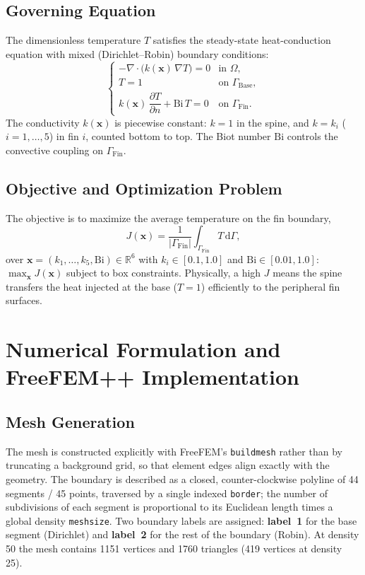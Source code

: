 \documentclass[11pt,a4paper]{article}
\begin{document}
\subsection{Governing Equation}
The dimensionless temperature $T$ satisfies the steady-state heat-conduction equation with mixed
(Dirichlet--Robin) boundary conditions:
\begin{equation}
\begin{cases}
-\nabla\cdot\big(k(\mathbf{x})\,\nabla T\big)=0 & \text{in }\Omega,\\[2pt]
T=1 & \text{on }\Gamma_{\text{Base}},\\[2pt]
k(\mathbf{x})\,\dfrac{\partial T}{\partial n}+\mathrm{Bi}\,T=0 & \text{on }\Gamma_{\text{Fin}}.
\end{cases}
\end{equation}
The conductivity $k(\mathbf{x})$ is piecewise constant: $k=1$ in the spine, and $k=k_i$
($i=1,\dots,5$) in fin $i$, counted bottom to top. The Biot number $\mathrm{Bi}$ controls the
convective coupling on $\Gamma_{\text{Fin}}$.

\subsection{Objective and Optimization Problem}
The objective is to maximize the average temperature on the fin boundary,
\begin{equation}
J(\mathbf{x})=\frac{1}{|\Gamma_{\text{Fin}}|}\int_{\Gamma_{\text{Fin}}}T\,\mathrm{d}\Gamma,
\end{equation}
over $\mathbf{x}=(k_1,\dots,k_5,\mathrm{Bi})\in\mathbb{R}^6$ with $k_i\in[0.1,1.0]$ and
$\mathrm{Bi}\in[0.01,1.0]$: $\max_{\mathbf{x}}J(\mathbf{x})$ subject to box constraints. Physically,
a high $J$ means the spine transfers the heat injected at the base ($T=1$) efficiently to the
peripheral fin surfaces.

\section{Numerical Formulation and FreeFEM++ Implementation}
\subsection{Mesh Generation}
The mesh is constructed explicitly with FreeFEM's \texttt{buildmesh} rather than by truncating a
background grid, so that element edges align exactly with the geometry. The boundary is described
as a closed, counter-clockwise polyline of 44 segments / 45 points, traversed by a single indexed
\texttt{border}; the number of subdivisions of each segment is proportional to its Euclidean length
times a global density \texttt{meshsize}. Two boundary labels are assigned: \textbf{label~1} for the
base segment (Dirichlet) and \textbf{label~2} for the rest of the boundary (Robin). At density 50 the
mesh contains 1151 vertices and 1760 triangles (419 vertices at density 25).
\end{document}
